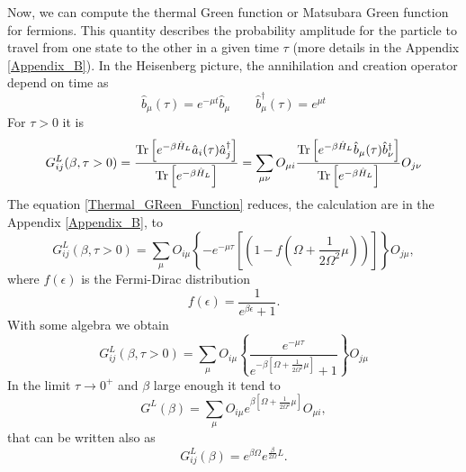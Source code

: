 Now, we can compute the thermal Green function or Matsubara Green function for fermions. This quantity describes the probability amplitude for the particle to travel from one state to the other in a given time $\tau$ (more details in the Appendix \ref{Appendix_B}).
In the Heisenberg picture, the annihilation and creation operator depend on time \cite{Coleman_2015} as
\begin{equation}
    \hat b_\mu (\tau) = e^{-\mu t} \hat b_\mu \qquad \hat b_\mu^\dagger (\tau) = e^{\mu t} 
\end{equation}
For $\tau > 0$ it is
\begin{equation}\label{Thermal_GReen_Function}
    \begin{split}
        G^L_{ij}(\beta, \tau > 0) &= \frac{\operatorname{Tr}\left[e^{-\beta \hat H_L}\hat a_i (\tau)  \hat a_j^\dagger\right]}{\operatorname{Tr}\left[e^{-\beta \hat H_L}\right]} =\sum_{\mu\nu} O_{\mu i}\frac{\operatorname{Tr}\left[ e^{-\beta \hat H_L} \hat b_\mu (\tau)\hat b_\nu^\dagger\right]}{\operatorname{Tr}\left[e^{-\beta \hat H_L}\right]}O_{j\nu}\\
    \end{split}
\end{equation}
The equation \eqref{Thermal_GReen_Function} reduces, the calculation are in the Appendix \ref{Appendix_B}, to
\begin{equation}
    G^L_{ij}(\beta, \tau > 0) = \sum_{\mu} O_{i\mu}\left\{-e^{-\mu \tau}\left[\left(1-f\left( \Omega + \frac{1}{2\Omega^2}\mu\right)\right)\right]\right\}O_{j\mu},
\end{equation} 
where $f(\epsilon)$ is the Fermi-Dirac distribution
\begin{equation}
    f(\epsilon)=\frac{1}{e^{\beta\epsilon} + 1}.
\end{equation}
With some algebra we obtain
\begin{equation}
    G^L_{ij}(\beta, \tau > 0) = \sum_{\mu} O_{i\mu}\left\{\frac{e^{-\mu \tau}}{e^{-\beta\left[ \Omega + \frac{1}{2\Omega^2}\mu\right]} + 1}\right\}O_{j\mu}
\end{equation}
In the limit $\tau \rightarrow 0^+$ and $\beta$ large enough it tend to
\begin{equation}\label{Quantum_correlation}
    G^L(\beta) = \sum_{\mu} O_{i\mu}{e^{\beta\left[ \Omega + \frac{1}{2\Omega^2}\mu\right]}} O_{\mu i},
\end{equation}
that can be written also as
\begin{equation}\label{quantum_correlation_2}
    G^L_{ij}(\beta)= e^{\beta \Omega}e^{\frac{\beta}{2\Omega}L}.
\end{equation}

